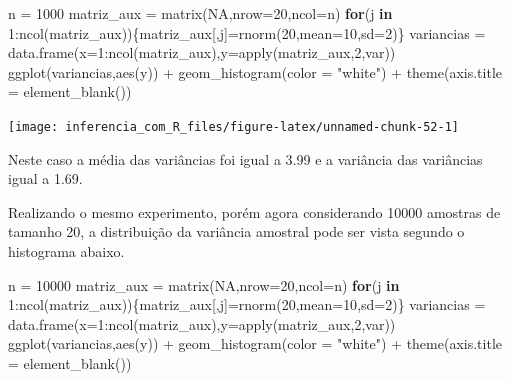 \documentclass[
]{book}
\newenvironment{Shaded}{\begin{snugshade}}{\end{snugshade}}
\newcommand{\AttributeTok}[1]{\textcolor[rgb]{0.77,0.63,0.00}{#1}}
\newcommand{\ConstantTok}[1]{\textcolor[rgb]{0.00,0.00,0.00}{#1}}
\newcommand{\ControlFlowTok}[1]{\textcolor[rgb]{0.13,0.29,0.53}{\textbf{#1}}}
\newcommand{\DecValTok}[1]{\textcolor[rgb]{0.00,0.00,0.81}{#1}}
\newcommand{\FunctionTok}[1]{\textcolor[rgb]{0.00,0.00,0.00}{#1}}
\newcommand{\NormalTok}[1]{#1}
\newcommand{\OtherTok}[1]{\textcolor[rgb]{0.56,0.35,0.01}{#1}}
\newcommand{\SpecialCharTok}[1]{\textcolor[rgb]{0.00,0.00,0.00}{#1}}
\newcommand{\StringTok}[1]{\textcolor[rgb]{0.31,0.60,0.02}{#1}}
\begin{document}
\begin{Shaded}
\begin{Highlighting}[]
\NormalTok{n }\OtherTok{=} \DecValTok{1000}
\NormalTok{matriz\_aux }\OtherTok{=} \FunctionTok{matrix}\NormalTok{(}\ConstantTok{NA}\NormalTok{,}\AttributeTok{nrow=}\DecValTok{20}\NormalTok{,}\AttributeTok{ncol=}\NormalTok{n)}
\ControlFlowTok{for}\NormalTok{(j }\ControlFlowTok{in} \DecValTok{1}\SpecialCharTok{:}\FunctionTok{ncol}\NormalTok{(matriz\_aux))\{matriz\_aux[,j]}\OtherTok{=}\FunctionTok{rnorm}\NormalTok{(}\DecValTok{20}\NormalTok{,}\AttributeTok{mean=}\DecValTok{10}\NormalTok{,}\AttributeTok{sd=}\DecValTok{2}\NormalTok{)\}}
\NormalTok{variancias }\OtherTok{=} \FunctionTok{data.frame}\NormalTok{(}\AttributeTok{x=}\DecValTok{1}\SpecialCharTok{:}\FunctionTok{ncol}\NormalTok{(matriz\_aux),}\AttributeTok{y=}\FunctionTok{apply}\NormalTok{(matriz\_aux,}\DecValTok{2}\NormalTok{,var))}
\FunctionTok{ggplot}\NormalTok{(variancias,}\FunctionTok{aes}\NormalTok{(y)) }\SpecialCharTok{+}
  \FunctionTok{geom\_histogram}\NormalTok{(}\AttributeTok{color =} \StringTok{"white"}\NormalTok{) }\SpecialCharTok{+}
  \FunctionTok{theme}\NormalTok{(}\AttributeTok{axis.title =} \FunctionTok{element\_blank}\NormalTok{())}
\end{Highlighting}
\end{Shaded}

\begin{center}\texttt{[image: inferencia\_com\_R\_files/figure-latex/unnamed-chunk-52-1]} \end{center}

Neste caso a média das variâncias foi igual a 3.99 e a variância das variâncias igual a 1.69.

Realizando o mesmo experimento, porém agora considerando 10000 amostras de tamanho 20, a distribuição da variância amostral pode ser vista segundo o histograma abaixo.

\begin{Shaded}
\begin{Highlighting}[]
\NormalTok{n }\OtherTok{=} \DecValTok{10000}
\NormalTok{matriz\_aux }\OtherTok{=} \FunctionTok{matrix}\NormalTok{(}\ConstantTok{NA}\NormalTok{,}\AttributeTok{nrow=}\DecValTok{20}\NormalTok{,}\AttributeTok{ncol=}\NormalTok{n)}
\ControlFlowTok{for}\NormalTok{(j }\ControlFlowTok{in} \DecValTok{1}\SpecialCharTok{:}\FunctionTok{ncol}\NormalTok{(matriz\_aux))\{matriz\_aux[,j]}\OtherTok{=}\FunctionTok{rnorm}\NormalTok{(}\DecValTok{20}\NormalTok{,}\AttributeTok{mean=}\DecValTok{10}\NormalTok{,}\AttributeTok{sd=}\DecValTok{2}\NormalTok{)\}}
\NormalTok{variancias }\OtherTok{=} \FunctionTok{data.frame}\NormalTok{(}\AttributeTok{x=}\DecValTok{1}\SpecialCharTok{:}\FunctionTok{ncol}\NormalTok{(matriz\_aux),}\AttributeTok{y=}\FunctionTok{apply}\NormalTok{(matriz\_aux,}\DecValTok{2}\NormalTok{,var))}
\FunctionTok{ggplot}\NormalTok{(variancias,}\FunctionTok{aes}\NormalTok{(y)) }\SpecialCharTok{+}
  \FunctionTok{geom\_histogram}\NormalTok{(}\AttributeTok{color =} \StringTok{"white"}\NormalTok{) }\SpecialCharTok{+}
  \FunctionTok{theme}\NormalTok{(}\AttributeTok{axis.title =} \FunctionTok{element\_blank}\NormalTok{())}
\end{Highlighting}
\end{Shaded}
\end{document}
